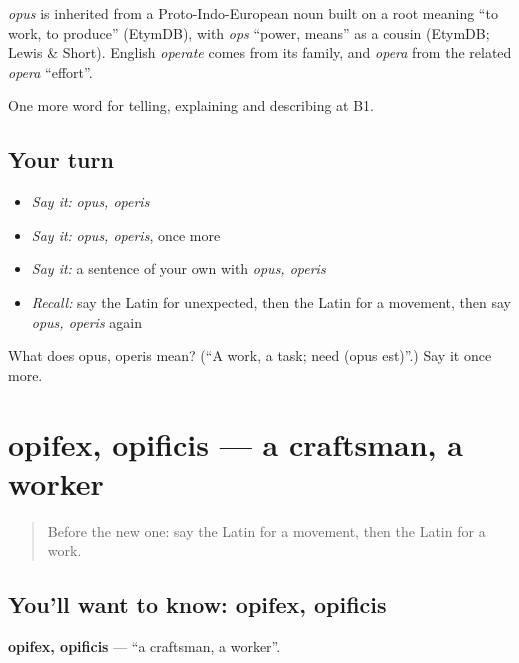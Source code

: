 \begin{cousinweb}
\emph{opus} is inherited from a Proto-Indo-European noun built on a root meaning \textquotedblleft{}to work, to produce\textquotedblright{} (EtymDB), with \emph{ops} \textquotedblleft{}power, means\textquotedblright{} as a cousin (EtymDB; Lewis \& Short). English \emph{operate} comes from its family, and \emph{opera} from the related \emph{opera} \textquotedblleft{}effort\textquotedblright{}.
\end{cousinweb}

\begin{grammarlens}[title={What you've built}]
One more word for telling, explaining and describing at B1.
\end{grammarlens}

\subsection*{Your turn}
\begin{itemize}
\raggedright
  \item \emph{Say it:} \emph{opus, operis}
  \item \emph{Say it:} \emph{opus, operis}, once more
  \item \emph{Say it:} a sentence of your own with \emph{opus, operis}
  \item \emph{Recall:} say the Latin for unexpected, then the Latin for a movement, then say \emph{opus, operis} again
\end{itemize}

\begin{tcolorbox}[breakable,colback=teal!4,colframe=teal!35!black,title={Before you move on}]
What does opus, operis mean? (\textquotedblleft{}A work, a task; need (opus est)\textquotedblright{}.) Say it once more.
\end{tcolorbox}
\section[opifex, opificis]{opifex, opificis — a craftsman, a worker}

\label{lesson:LA-C376-opifex}



\begin{quote}
Before the new one: say the Latin for a movement, then the Latin for a work.
\end{quote}

\subsection*{You'll want to know: opifex, opificis}
\textbf{opifex, opificis} — \textquotedblleft{}a craftsman, a worker\textquotedblright{}.

